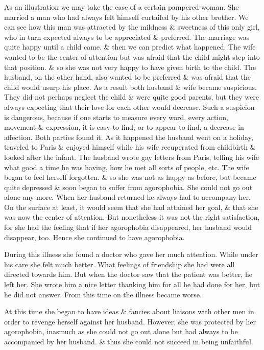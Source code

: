 \documentclass{article}
\begin{document}
As an illustration we may take the case of a certain pampered woman. She married a man who had always felt himself curtailed by his other brother. We can see how this man was attracted by the mildness \& sweetness of this only girl, who in turn expected always to be appreciated \& preferred. The marriage was quite happy until a child came. \& then we can predict what happened. The wife wanted to be the center of attention but was afraid that the child might step into that position. \& so she was not very happy to have given birth to the child. The husband, on the other hand, also wanted to be preferred \& was afraid that the child would usurp his place. As a result both husband \& wife became suspicious. They did not perhaps neglect the child \& were quite good parents, but they were always expecting that their love for each other would decrease. Such a suspicion is dangerous, because if one starts to measure every word, every action, movement \& expression, it is easy to find, or to appear to find, a decrease in affection. Both parties found it. As it happened the husband went on a holiday, traveled to Paris \& enjoyed himself while his wife recuperated from childbirth \& looked after the infant. The husband wrote gay letters from Paris, telling his wife what good a time he was having, how he met all sorts of people, etc. The wife began to feel herself forgotten. \& so she was not as happy as before, but became quite depressed \& soon began to suffer from agorophobia. She could not go out alone any more. When her husband returned he always had to accompany her. On the surface at least, it would seem that she had attained her goal, \& that she was now the center of attention. But nonetheless it was not the right satisfaction, for she had the feeling that if her agorophobia disappeared, her husband would disappear, too. Hence she continued to have agorophobia.

During this illness she found a doctor who gave her much attention. While under his care she felt much better. What feelings of friendship she had were all directed towards him. But when the doctor saw that the patient was better, he left her. She wrote him a nice letter thanking him for all he had done for her, but he did not answer. From this time on the illness became worse.

At this time she began to have ideas \& fancies about liaisons with other men in order to revenge herself against her husband. However, she was protected by her agorophobia, inasmuch as she could not go out alone but had always to be accompanied by her husband. \& thus she could not succeed in being unfaithful.
\end{document}
